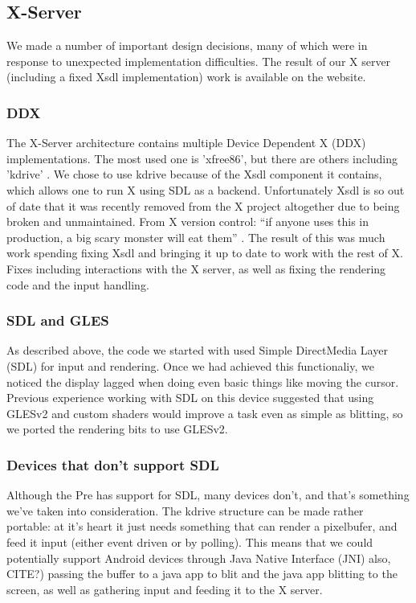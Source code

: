 \subsection{X-Server}

We made a number of important design decisions, many of which were in response to unexpected implementation difficulties.  The result of our X server (including a fixed Xsdl implementation) work is available on the website.
\subsubsection{DDX}
The X-Server architecture contains multiple Device Dependent X (DDX) implementations.  The most used one is 'xfree86', but there are others including 'kdrive' \cite{x_glossary}.  We chose to use kdrive because of the Xsdl component it contains, which allows one to run X using SDL as a backend.  Unfortunately Xsdl is so out of date that it was recently removed from the X project altogether due to being broken and unmaintained.
From X version control: ``if anyone uses this in production, a big scary monster will eat them'' \cite{x_quote}.  The result of this was much work spending fixing Xsdl and bringing it up to date to work with the rest of X.  Fixes including interactions with the X server, as well as fixing the rendering code and the input handling.
\subsubsection{SDL and GLES}
As described above, the code we started with used Simple DirectMedia Layer (SDL) \cite{sdl} for input and rendering.  Once we had achieved this functionaliy, we noticed the display lagged when doing even basic things like moving the cursor.  Previous experience working with SDL on this device suggested that using GLESv2 \cite{gles} and custom shaders would improve a task even as simple as blitting, so we ported the rendering bits to use GLESv2.

\subsubsection{Devices that don't support SDL}
Although the Pre has support for SDL, many devices don't, and that's something we've taken into consideration.  The kdrive structure can be made rather portable: at it's heart it just needs something that can render a pixelbufer, and feed it input (either event driven or by polling).  This means that we could potentially support Android devices through Java Native Interface (JNI) \cite{jni} also, CITE?) passing the buffer to a java app to blit and the java app blitting to the screen, as well as gathering input and feeding it to the X server.
